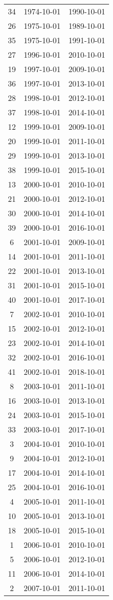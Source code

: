 % 
\begin{tabular}{ccc}
  \hline
  \hline
34 & 1974-10-01 & 1990-10-01 \\ 
  26 & 1975-10-01 & 1989-10-01 \\ 
  35 & 1975-10-01 & 1991-10-01 \\ 
  27 & 1996-10-01 & 2010-10-01 \\ 
  19 & 1997-10-01 & 2009-10-01 \\ 
  36 & 1997-10-01 & 2013-10-01 \\ 
  28 & 1998-10-01 & 2012-10-01 \\ 
  37 & 1998-10-01 & 2014-10-01 \\ 
  12 & 1999-10-01 & 2009-10-01 \\ 
  20 & 1999-10-01 & 2011-10-01 \\ 
  29 & 1999-10-01 & 2013-10-01 \\ 
  38 & 1999-10-01 & 2015-10-01 \\ 
  13 & 2000-10-01 & 2010-10-01 \\ 
  21 & 2000-10-01 & 2012-10-01 \\ 
  30 & 2000-10-01 & 2014-10-01 \\ 
  39 & 2000-10-01 & 2016-10-01 \\ 
  6 & 2001-10-01 & 2009-10-01 \\ 
  14 & 2001-10-01 & 2011-10-01 \\ 
  22 & 2001-10-01 & 2013-10-01 \\ 
  31 & 2001-10-01 & 2015-10-01 \\ 
  40 & 2001-10-01 & 2017-10-01 \\ 
  7 & 2002-10-01 & 2010-10-01 \\ 
  15 & 2002-10-01 & 2012-10-01 \\ 
  23 & 2002-10-01 & 2014-10-01 \\ 
  32 & 2002-10-01 & 2016-10-01 \\ 
  41 & 2002-10-01 & 2018-10-01 \\ 
  8 & 2003-10-01 & 2011-10-01 \\ 
  16 & 2003-10-01 & 2013-10-01 \\ 
  24 & 2003-10-01 & 2015-10-01 \\ 
  33 & 2003-10-01 & 2017-10-01 \\ 
  3 & 2004-10-01 & 2010-10-01 \\ 
  9 & 2004-10-01 & 2012-10-01 \\ 
  17 & 2004-10-01 & 2014-10-01 \\ 
  25 & 2004-10-01 & 2016-10-01 \\ 
  4 & 2005-10-01 & 2011-10-01 \\ 
  10 & 2005-10-01 & 2013-10-01 \\ 
  18 & 2005-10-01 & 2015-10-01 \\ 
  1 & 2006-10-01 & 2010-10-01 \\ 
  5 & 2006-10-01 & 2012-10-01 \\ 
  11 & 2006-10-01 & 2014-10-01 \\ 
  2 & 2007-10-01 & 2011-10-01 \\ 
   \hline
\end{tabular}
